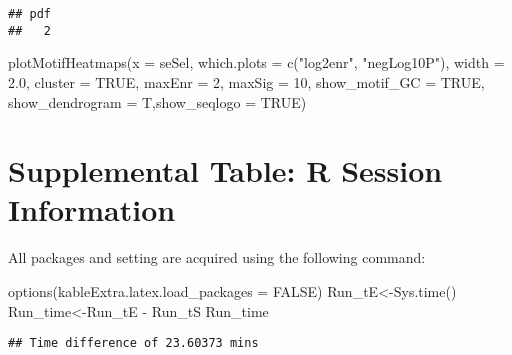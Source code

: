 \documentclass[
  10pt,
]{article}
\newenvironment{Shaded}{\begin{snugshade}}{\end{snugshade}}
\newcommand{\AttributeTok}[1]{\textcolor[rgb]{0.77,0.63,0.00}{#1}}
\newcommand{\ConstantTok}[1]{\textcolor[rgb]{0.00,0.00,0.00}{#1}}
\newcommand{\DecValTok}[1]{\textcolor[rgb]{0.00,0.00,0.81}{#1}}
\newcommand{\FloatTok}[1]{\textcolor[rgb]{0.00,0.00,0.81}{#1}}
\newcommand{\FunctionTok}[1]{\textcolor[rgb]{0.00,0.00,0.00}{#1}}
\newcommand{\NormalTok}[1]{#1}
\newcommand{\OtherTok}[1]{\textcolor[rgb]{0.56,0.35,0.01}{#1}}
\newcommand{\SpecialCharTok}[1]{\textcolor[rgb]{0.00,0.00,0.00}{#1}}
\newcommand{\StringTok}[1]{\textcolor[rgb]{0.31,0.60,0.02}{#1}}
\begin{document}
\begin{verbatim}
## pdf 
##   2
\end{verbatim}

\begin{Shaded}
\begin{Highlighting}[]
\FunctionTok{plotMotifHeatmaps}\NormalTok{(}\AttributeTok{x =}\NormalTok{ seSel, }\AttributeTok{which.plots =} \FunctionTok{c}\NormalTok{(}\StringTok{"log2enr"}\NormalTok{, }\StringTok{"negLog10P"}\NormalTok{), }
                  \AttributeTok{width =} \FloatTok{2.0}\NormalTok{, }\AttributeTok{cluster =} \ConstantTok{TRUE}\NormalTok{, }\AttributeTok{maxEnr =} \DecValTok{2}\NormalTok{, }\AttributeTok{maxSig =} \DecValTok{10}\NormalTok{, }
                  \AttributeTok{show\_motif\_GC =} \ConstantTok{TRUE}\NormalTok{, }\AttributeTok{show\_dendrogram =}\NormalTok{ T,}\AttributeTok{show\_seqlogo =} \ConstantTok{TRUE}\NormalTok{)}
\end{Highlighting}
\end{Shaded}

\hypertarget{supplemental-table-r-session-information}{%
\section{Supplemental Table: R Session
Information}\label{supplemental-table-r-session-information}}

All packages and setting are acquired using the following command:

\begin{Shaded}
\begin{Highlighting}[]
\FunctionTok{options}\NormalTok{(}\AttributeTok{kableExtra.latex.load\_packages =} \ConstantTok{FALSE}\NormalTok{)}
\NormalTok{Run\_tE}\OtherTok{\textless{}{-}}\FunctionTok{Sys.time}\NormalTok{()}
\NormalTok{Run\_time}\OtherTok{\textless{}{-}}\NormalTok{Run\_tE }\SpecialCharTok{{-}}\NormalTok{ Run\_tS}
\NormalTok{Run\_time}
\end{Highlighting}
\end{Shaded}

\begin{verbatim}
## Time difference of 23.60373 mins
\end{verbatim}

\begin{Shaded}
\end{Shaded}
\end{document}
